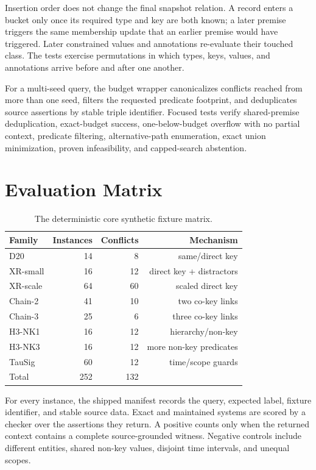 \documentclass[letterpaper]{article}
\begin{document}
Insertion order does not change the final snapshot relation.  A record enters
a bucket only once its required type and key are both known; a later premise
triggers the same membership update that an earlier premise would have
triggered.  Later constrained values and annotations re-evaluate their touched
class.  The tests exercise permutations in which types, keys, values, and
annotations arrive before and after one another.

For a multi-seed query, the budget wrapper canonicalizes conflicts reached
from more than one seed, filters the requested predicate footprint, and
deduplicates source assertions by stable triple identifier.  Focused tests
verify shared-premise deduplication, exact-budget success, one-below-budget
overflow with no partial context, predicate filtering, alternative-path
enumeration, exact union minimization, proven infeasibility, and capped-search
abstention.

\section{Evaluation Matrix}

\begin{table}[t]
\centering
\small
\begin{tabular}{lrrr}
\toprule
Family & Instances & Conflicts & Mechanism \\
\midrule
D20 & 14 & 8 & same/direct key \\
XR-small & 16 & 12 & direct key + distractors \\
XR-scale & 64 & 60 & scaled direct key \\
Chain-2 & 41 & 10 & two co-key links \\
Chain-3 & 25 & 6 & three co-key links \\
H3-NK1 & 16 & 12 & hierarchy/non-key \\
H3-NK3 & 16 & 12 & more non-key predicates \\
TauSig & 60 & 12 & time/scope guards \\
\midrule
Total & 252 & 132 & \\
\bottomrule
\end{tabular}
\caption{The deterministic core synthetic fixture matrix.}
\end{table}

For every instance, the shipped manifest records the query, expected label,
fixture identifier, and stable source data.  Exact and maintained systems are
scored by a checker over the assertions they return.  A positive counts only
when the returned context contains a complete source-grounded witness.
Negative controls include different entities, shared non-key values, disjoint
time intervals, and unequal scopes.
\end{document}

